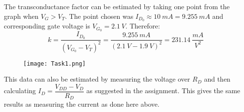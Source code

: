 The transconductance factor can be estimated by taking one point from the graph when $V_G > V_T$. The point chosen was $I_{D_0} \approx 10 \ mA = 9.255 \ mA $ and corresponding gate voltage is $V_{G_0} = 2.1 \ V$. Therefore: $$ k = \dfrac{I_{D_0}}{(V_{G_0}-V_T)^2} = \dfrac{9.255 \ mA}{(2.1 \ V - 1.9 \ V)^2} = 231.14 \ \dfrac{mA}{V^2} $$

\begin{figure}[h!]
        \centering
        \texttt{[image: Task1.png]}
\end{figure}

This data can also be estimated by measuring the voltage over $R_D$ and then calculating $I_D = \dfrac{V_{DD}-V_D}{R_D}$ as suggested in the assignment. This gives the same results as measuring the current as done here above.

